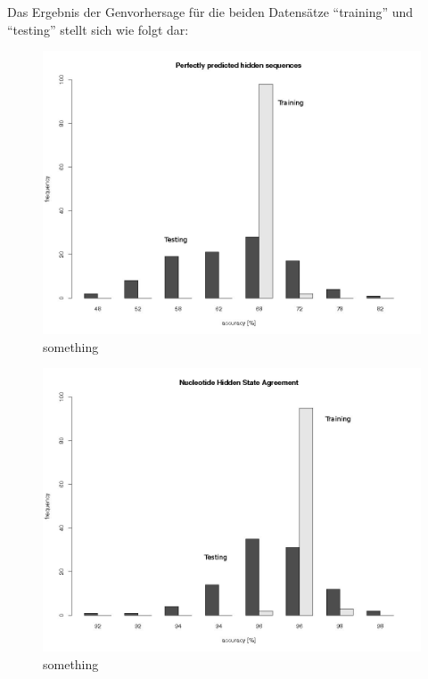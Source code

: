 Das Ergebnis der Genvorhersage für die beiden Datensätze \enquote{training} und
\enquote{testing} stellt sich wie folgt dar:

\begin{figure}[ht]
	\begin{center}
		\includegraphics[scale=0.42]{pics/perfectm.jpg}
	\caption{something}
	\end{center}
	\label{fig:perfect}
\end{figure}

\begin{figure}[ht]
	\begin{center}
		\includegraphics[scale=0.42]{pics/stateAgreementm.jpg}
	\caption{something}
	\end{center}
	\label{fig:stateAgreement}
\end{figure}
